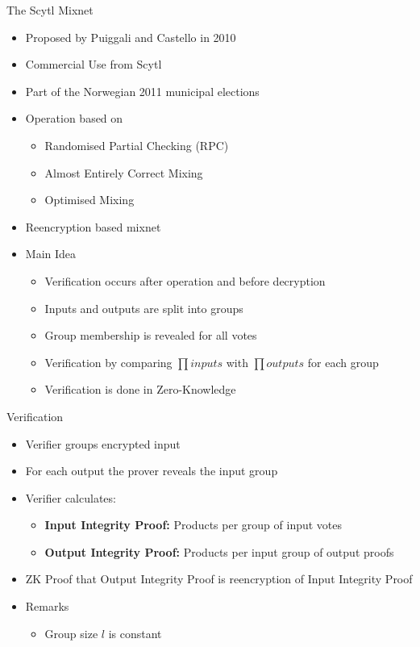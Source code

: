\documentclass{beamer}
\begin{document}
\begin{frame}[allowframebreaks]{The Scytl Mixnet \cite{SCYTL10}}
\begin{itemize}
\item Proposed by Puiggali and Castello in 2010
\item Commercial Use from Scytl
\item Part of the Norwegian 2011 municipal elections
\item Operation based on
\begin{itemize}
	\item Randomised Partial Checking (RPC)
	\item Almost Entirely Correct Mixing
	\item Optimised Mixing
\end{itemize}
\item Reencryption based mixnet
\item Main Idea
\begin{itemize}
\item Verification occurs after operation and before decryption
\item Inputs and outputs are split into groups
\item Group membership is revealed for all votes
\item Verification by comparing $\prod inputs$ with $\prod outputs$ for each group
\item Verification is done in Zero-Knowledge
\end{itemize}
\end{itemize}
\begin{block}{Verification}
\begin{itemize}
\item Verifier groups encrypted input
\item For each output the prover reveals the input group
\item Verifier calculates:
\begin{itemize}
\item \textbf{Input Integrity Proof:} Products per group of input votes
\item \textbf{Output Integrity Proof:} Products per input group of output proofs
\end{itemize}
\item ZK Proof that Output Integrity Proof is reencryption of Input Integrity Proof
\item Remarks
\begin{itemize}
\item Group size $l$ is constant

\end{itemize}
\end{itemize}
\end{block}
\end{frame}
\end{document}
